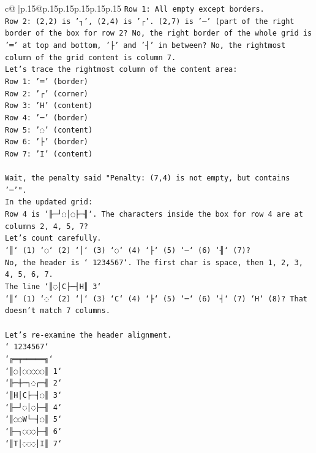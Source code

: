\documentclass{article}
\begin{document}
{\begin{supertabular}{c@{$\;$}|p{.15\linewidth}@{}p{.15\linewidth}p{.15\linewidth}p{.15\linewidth}p{.15\linewidth}p{.15\linewidth}}
{{{\texttt{Row 1: All empty except borders.} \\
\texttt{Row 2: (2,2) is '┐', (2,4) is '┌'. (2,7) is '─' (part of the right border of the box for row 2? No, the right border of the whole grid is '═' at top and bottom, '├' and '┤' in between? No, the rightmost column of the grid content is column 7.} \\
\texttt{Let's trace the rightmost column of the content area:} \\
\texttt{Row 1: '═' (border)} \\
\texttt{Row 2: '┌' (corner)} \\
\texttt{Row 3: 'H' (content)} \\
\texttt{Row 4: '─' (border)} \\
\texttt{Row 5: '◌' (content)} \\
\texttt{Row 6: '├' (border)} \\
\texttt{Row 7: 'I' (content)} \\
\\ 
\texttt{Wait, the penalty said "Penalty: (7,4) is not empty, but contains '─'".} \\
\texttt{In the updated grid:} \\
\texttt{Row 4 is `╟─┘◌│◌├─╢`. The characters inside the box for row 4 are at columns 2, 4, 5, 7?} \\
\texttt{Let's count carefully.} \\
\texttt{`║` (1) `◌` (2) `│` (3) `◌` (4) `├` (5) `─` (6) `╢` (7)?} \\
\texttt{No, the header is ` 1234567`. The first char is space, then 1, 2, 3, 4, 5, 6, 7.} \\
\texttt{The line `║◌│C├─┤H║ 3`} \\
\texttt{`║` (1) `◌` (2) `│` (3) `C` (4) `├` (5) `─` (6) `┤` (7) `H` (8)? That doesn't match 7 columns.} \\
\\ 
\texttt{Let's re{-}examine the header alignment.} \\
\texttt{` 1234567`} \\
\texttt{`╔═╤═════╗`} \\
\texttt{`║◌│◌◌◌◌◌║ 1`} \\
\texttt{`╟─┼─┐◌┌─╢ 2`} \\
\texttt{`║H│C├─┤◌║ 3`} \\
\texttt{`╟─┘◌│◌├─╢ 4`} \\
\texttt{`║◌◌W└─┤◌║ 5`} \\
\texttt{`╟─┐◌◌◌├─╢ 6`} \\
\texttt{`║T│◌◌◌│I║ 7`} \\
}}}
\end{supertabular}}
\end{document}
